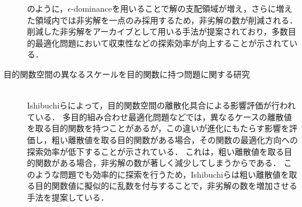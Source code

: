 \documentclass[../main/main]{subfiles}
\begin{document}
\begin{description}
のように，$\epsilon$-dominanceを用いることで解の支配領域が増え，さらに増えた領域内では非劣解を一点のみ採用するため，非劣解の数が削減される．
削減した非劣解をアーカイブとして用いる手法が提案されており，多数目的最適化問題において収束性などの探索効率が向上することが示されている．

\clearpage

\item[目的関数空間の異なるスケールを目的関数に持つ問題に関する研究]\mbox{}\\
\quad Ishibuchiらによって，目的関数空間の離散化具合による影響評価が行われている\cite{Ishibuchi2012Effects}．
多目的組み合わせ最適化問題などでは，異なるケースの離散値を取る目的関数を持つことがあるが，この違いが進化にもたらす影響を評価し，粗い離散値を取る目的関数がある場合，その関数の最適化方向への探索効率が低下することが示されている．
これは，粗い離散値を取る目的関数がある場合，非劣解の数が著しく減少してしまうからである．
このような問題でも効率的に探索を行うため，Ishibuchiらは粗い離散値を取る目的関数値に擬似的に乱数を付与することで，非劣解の数を増加させる手法を提案している．

\end{description}
\end{document}
